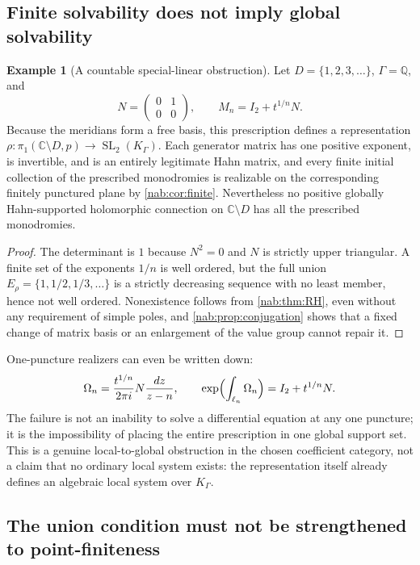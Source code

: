 \documentclass[11pt,letterpaper]{article}
\theoremstyle{definition}
\newtheorem{example}[example]{Example}
\theoremstyle{remark}
\newcommand{\C}{\mathbb C}
\newcommand{\Q}{\mathbb Q}
\newcommand{\K}{K_\Gamma}
\newcommand{\SL}{\operatorname{SL}}
\numberwithin{equation}{section}
\begin{document}
\subsection{Finite solvability does not imply global solvability}

\begin{example}[A countable special-linear obstruction]
\label{nab:ex:descending}
Let $D=\{1,2,3,\ldots\}$, $\Gamma=\Q$, and
\[
 N=\begin{pmatrix}0&1\\0&0\end{pmatrix},\qquad M_n=I_2+t^{1/n}N.
\]
Because the meridians form a free basis, this prescription defines a
representation $\rho:\pi_1(\C\setminus D,p)\to\SL_2(\K)$. Each generator matrix
has one positive exponent, is invertible, and is an entirely legitimate Hahn
matrix, and every finite initial collection of the prescribed monodromies is
realizable on the corresponding finitely punctured plane by
\cref{nab:cor:finite}. Nevertheless no positive globally Hahn-supported
holomorphic connection on $\C\setminus D$ has all the prescribed monodromies.
\end{example}

\begin{proof}
The determinant is $1$ because $N^2=0$ and $N$ is strictly upper triangular. A
finite set of the exponents $1/n$ is well ordered, but the full union
$E_\rho=\{1,1/2,1/3,\ldots\}$ is a strictly decreasing sequence with no least
member, hence not well ordered. Nonexistence follows from
\cref{nab:thm:RH}, even without any requirement of simple poles, and
\cref{nab:prop:conjugation} shows that a fixed change of matrix basis or an
enlargement of the value group cannot repair it.
\end{proof}

One-puncture realizers can even be written down:
\[
 \Omega_n=\frac{t^{1/n}}{2\pi i}N\frac{dz}{z-n},
 \qquad
 \exp\Bigl(\int_{\ell_n}\Omega_n\Bigr)=I_2+t^{1/n}N.
\]
The failure is not an inability to solve a differential equation at any one
puncture; it is the impossibility of placing the entire prescription in one
global support set. This is a genuine local-to-global obstruction in the chosen
coefficient category, not a claim that no ordinary local system exists: the
representation itself already defines an algebraic local system over $\K$.

\subsection{The union condition must not be strengthened to point-finiteness}
\end{document}

